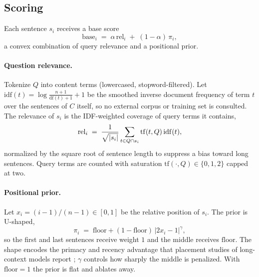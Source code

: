 \documentclass[preprint,12pt]{elsarticle}
\DeclarePairedDelimiter\abs{\lvert}{\rvert}
\theoremstyle{remark}
\begin{document}
\subsection{Scoring}
Each sentence $s_i$ receives a base score
\begin{equation}
\label{eq:base}
\mathrm{base}_i \;=\; \alpha\,\mathrm{rel}_i \;+\; (1-\alpha)\,\pi_i,
\end{equation}
a convex combination of query relevance and a positional prior.

\paragraph{Question relevance.}
Tokenize $Q$ into content terms (lowercased, stopword-filtered). Let
$\mathrm{idf}(t)=\log\frac{n+1}{\mathrm{df}(t)+1}+1$ be the smoothed
inverse document frequency of term $t$ over the sentences of $C$
itself, so no external corpus or training set is consulted. The
relevance of $s_i$ is the IDF-weighted coverage of query terms it
contains,
\begin{equation}
\label{eq:rel}
\mathrm{rel}_i \;=\;
\frac{1}{\sqrt{\abs{s_i}}}\sum_{t \in Q \cap s_i}
\mathrm{tf}(t, Q)\,\mathrm{idf}(t),
\end{equation}
normalized by the square root of sentence length to suppress a bias
toward long sentences. Query terms are counted with saturation
$\mathrm{tf}(\cdot,Q) \in \{0, 1, 2\}$ capped at two.

\paragraph{Positional prior.}
Let $x_i = (i-1)/(n-1)\in[0,1]$ be the relative position of $s_i$. The
prior is U-shaped,
\begin{equation}
\label{eq:pos}
\pi_i \;=\; \mathrm{floor} + (1-\mathrm{floor})\,
\lvert 2x_i - 1\rvert^{\gamma},
\end{equation}
so the first and last sentences receive weight $1$ and the middle
receives $\mathrm{floor}$. The shape encodes the primacy and recency
advantage that placement studies of long-context models report
\citep{liu2023lost}; $\gamma$ controls how sharply the middle is
penalized. With $\mathrm{floor}=1$ the prior is flat and ablates away.
\end{document}
